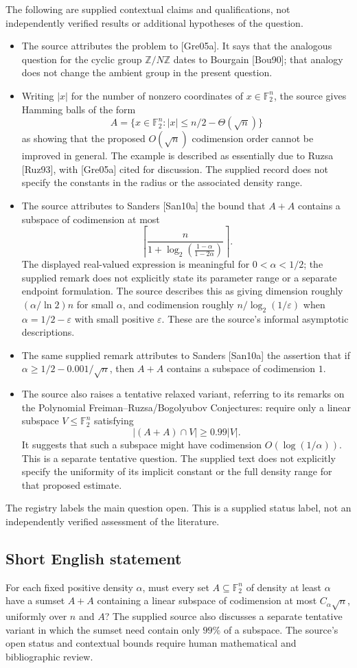 \documentclass[11pt]{article}
\newcommand{\Z}{\mathbb{Z}}
\newcommand{\F}{\mathbb{F}}
\begin{document}
The following are supplied contextual claims and qualifications, not independently verified results or additional hypotheses of the question.
\begin{itemize}
\item The source attributes the problem to [Gre05a]. It says that the analogous question for the cyclic group \(\Z/N\Z\) dates to Bourgain [Bou90]; that analogy does not change the ambient group in the present question.
\item Writing \(|x|\) for the number of nonzero coordinates of \(x\in\F_2^n\), the source gives Hamming balls of the form
\[
A=\{x\in\F_2^n:|x|\leq n/2-\Theta(\sqrt n)\}
\]
as showing that the proposed \(O(\sqrt n)\) codimension order cannot be improved in general. The example is described as essentially due to Ruzsa [Ruz93], with [Gre05a] cited for discussion. The supplied record does not specify the constants in the radius or the associated density range.
\item The source attributes to Sanders [San10a] the bound that \(A+A\) contains a subspace of codimension at most
\[
\left\lceil\frac{n}{1+\log_2\!\left(\frac{1-\alpha}{1-2\alpha}\right)}\right\rceil.
\]
The displayed real-valued expression is meaningful for \(0<\alpha<1/2\); the supplied remark does not explicitly state its parameter range or a separate endpoint formulation. The source describes this as giving dimension roughly \((\alpha/\ln 2)n\) for small \(\alpha\), and codimension roughly \(n/\log_2(1/\varepsilon)\) when \(\alpha=1/2-\varepsilon\) with small positive \(\varepsilon\). These are the source's informal asymptotic descriptions.
\item The same supplied remark attributes to Sanders [San10a] the assertion that if \(\alpha\geq 1/2-0.001/\sqrt n\), then \(A+A\) contains a subspace of codimension \(1\).
\item The source also raises a tentative relaxed variant, referring to its remarks on the Polynomial Freiman--Ruzsa/Bogolyubov Conjectures: require only a linear subspace \(V\leq\F_2^n\) satisfying
\[
|(A+A)\cap V|\geq 0.99|V|.
\]
It suggests that such a subspace might have codimension \(O(\log(1/\alpha))\). This is a separate tentative question. The supplied text does not explicitly specify the uniformity of its implicit constant or the full density range for that proposed estimate.
\end{itemize}
The registry labels the main question open. This is a supplied status label, not an independently verified assessment of the literature.
\subsection{Short English statement}
For each fixed positive density \(\alpha\), must every set \(A\subseteq\F_2^n\) of density at least \(\alpha\) have a sumset \(A+A\) containing a linear subspace of codimension at most \(C_\alpha\sqrt n\), uniformly over \(n\) and \(A\)? The supplied source also discusses a separate tentative variant in which the sumset need contain only \(99\%\) of a subspace. The source's open status and contextual bounds require human mathematical and bibliographic review.
\end{document}
